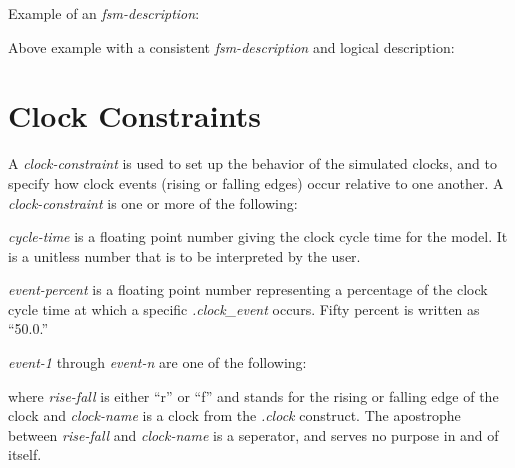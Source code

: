 {\begin{pespace}
Example of an {\em fsm-description}:
Above example with a consistent {\em fsm-description} and logical
description:

\section{Clock Constraints}

A {\em clock-constraint} is used to set up the behavior of the simulated
clocks, and to specify how clock events (rising or falling edges) occur
relative to one another.  A {\em clock-constraint} is one or more of the
following:

\begin{description}
\item {\em cycle-time} is a floating point number giving the clock cycle
time for the model.  It is a unitless number that is to be interpreted by
the user.

\item {\em event-percent} is a floating point number representing a
percentage of the clock cycle time at which a specific {\em .clock\_event}
occurs.  Fifty percent is written as ``50.0.''

\item {\em event-1} through {\em event-n} are one of the following:
where {\em rise-fall} is either ``r'' or ``f'' and stands for the rising or
falling edge of the clock and {\em clock-name} is a clock from the {\em
.clock} construct.  The apostrophe between {\em rise-fall} and {\em
clock-name} is a seperator, and serves no purpose in and of itself.


\end{description}
\end{pespace}}
